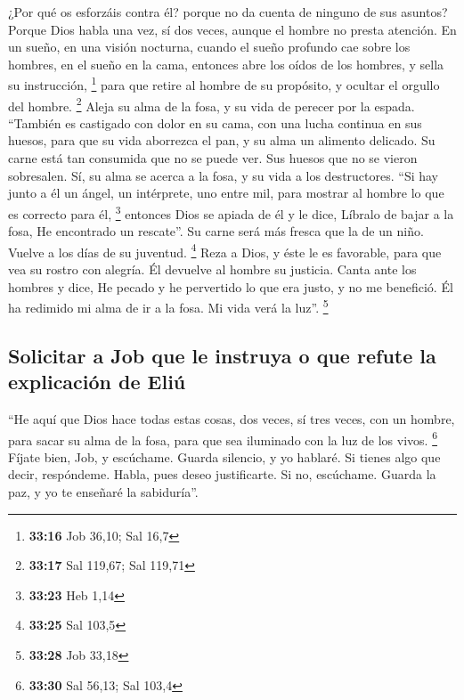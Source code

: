 \begin{paracol}{2}
 ¿Por qué os esforzáis contra él? porque no da cuenta de
ninguno de sus asuntos?  Porque Dios habla una vez, sí
dos veces, aunque el hombre no presta atención.  En un
sueño, en una visión nocturna, cuando el sueño profundo cae sobre los
hombres, en el sueño en la cama,  entonces abre los oídos
de los hombres, y sella su instrucción, \footnote{\textbf{33:16} Job
  36,10; Sal 16,7}  para que retire al hombre de su
propósito, y ocultar el orgullo del hombre. \footnote{\textbf{33:17} Sal
  119,67; Sal 119,71}  Aleja su alma de la fosa, y su
vida de perecer por la espada.  ``También es castigado
con dolor en su cama, con una lucha continua en sus huesos,
 para que su vida aborrezca el pan, y su alma un alimento
delicado.  Su carne está tan consumida que no se puede
ver. Sus huesos que no se vieron sobresalen.  Sí, su alma
se acerca a la fosa, y su vida a los destructores.  ``Si
hay junto a él un ángel, un intérprete, uno entre mil, para mostrar al
hombre lo que es correcto para él, \footnote{\textbf{33:23} Heb 1,14}
 entonces Dios se apiada de él y le dice, Líbralo de
bajar a la fosa, He encontrado un rescate''.  Su carne
será más fresca que la de un niño. Vuelve a los días de su juventud.
\footnote{\textbf{33:25} Sal 103,5}  Reza a Dios, y éste
le es favorable, para que vea su rostro con alegría. Él devuelve al
hombre su justicia.  Canta ante los hombres y dice, He
pecado y he pervertido lo que era justo, y no me benefició.
 Él ha redimido mi alma de ir a la fosa. Mi vida verá la
luz''. \footnote{\textbf{33:28} Job 33,18}

\hypertarget{solicitar-a-job-que-le-instruya-o-que-refute-la-explicaciuxf3n-de-eliuxfa}{%
\subsection{Solicitar a Job que le instruya o que refute la explicación
de
Eliú}\label{solicitar-a-job-que-le-instruya-o-que-refute-la-explicaciuxf3n-de-eliuxfa}}

 ``He aquí que Dios hace todas estas cosas, dos veces, sí
tres veces, con un hombre,  para sacar su alma de la
fosa, para que sea iluminado con la luz de los vivos. \footnote{\textbf{33:30}
  Sal 56,13; Sal 103,4}  Fíjate bien, Job, y escúchame.
Guarda silencio, y yo hablaré.  Si tienes algo que decir,
respóndeme. Habla, pues deseo justificarte.  Si no,
escúchame. Guarda la paz, y yo te enseñaré la sabiduría''.


\end{paracol}
